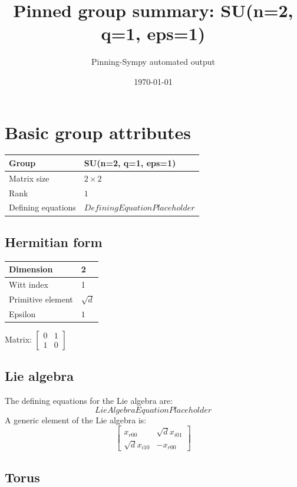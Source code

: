 \documentclass[11pt]{article}
\title{Pinned group summary: SU(n=2, q=1, eps=1)}
\author{Pinning-Sympy automated output}
\date{\today}
\theoremstyle{definition}
\begin{document}
\maketitle
\tableofcontents

\newpage

\section{Basic group attributes}

\begin{tabular}{|l|l|}
	\hline
    Group & SU(n=2, q=1, eps=1) \\
	\hline
    Matrix size & $2 \times 2$ \\
	\hline
    Rank & $1$ \\
	\hline
	Defining equations & $DefiningEquationPlaceholder$ \\
	\hline
\end{tabular}

\subsection{Hermitian form}
\begin{tabular}{|l|l|}
    \hline
    Dimension & 2 \\
    \hline
    Witt index & 1 \\
    \hline
    Primitive element & $\sqrt{d}$ \\
    \hline
    Epsilon & $1$ \\
    \hline
\end{tabular}

\bigskip
\noindent Matrix: \(
\left[\begin{matrix}0 & 1\\1 & 0\end{matrix}\right]
\)



\subsection{Lie algebra}

The defining equations for the Lie algebra are:
\[
LieAlgebraEquationPlaceholder
\]
A generic element of the Lie algebra is:
\[
\left[\begin{matrix}x_{r 0 0} & \sqrt{d} x_{i 0 1}\\\sqrt{d} x_{i 1 0} & - x_{r 0 0}\end{matrix}\right]
\]

\subsection{Torus}
\end{document}
